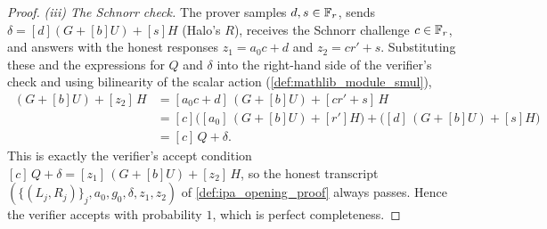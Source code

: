 \begin{proof}
  \emph{(iii) The Schnorr check.} The prover samples \(d, s \in \mathbb{F}_r\), sends
  \(\delta = [d](G + [b]U) + [s]H\) (Halo's \(R\)), receives the Schnorr
  challenge \(c \in \mathbb{F}_r\), and answers with the honest responses
  \(z_{1} = a_{0} c + d\) and \(z_{2} = c r' + s\). Substituting these and the
  expressions for \(Q\) and \(\delta\) into the right-hand side of the
  verifier's check and using bilinearity of the scalar action
  (\cref{def:mathlib_module_smul}),
  \begin{align*}
    [z_{1}]\,(G + [b]U) + [z_{2}]\,H
      &= [a_{0} c + d]\,(G + [b]U) + [c r' + s]\,H \\
      &= [c]\bigl([a_{0}]\,(G + [b]U) + [r']H\bigr)
         + \bigl([d]\,(G + [b]U) + [s]H\bigr) \\
      &= [c]\,Q + \delta.
  \end{align*}
  This is exactly the verifier's accept condition
  \([c]\,Q + \delta = [z_{1}]\,(G + [b]U) + [z_{2}]\,H\), so the honest
  transcript \((\{(L_{j}, R_{j})\}_{j}, a_{0}, g_{0}, \delta, z_{1}, z_{2})\) of
  \cref{def:ipa_opening_proof} always passes. Hence the verifier accepts with
  probability \(1\), which is perfect completeness.
\end{proof}

